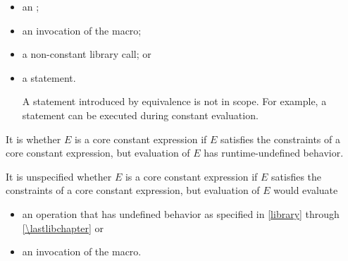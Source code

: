 \begin{itemize}
\item
an ;

\item
an invocation of the  macro;

\item
a non-constant library call;
or

\item
a  statement.
\begin{note}
A  statement introduced by equivalence
is not in scope.
For example, a  statement
can be executed during constant evaluation.
\end{note}
\end{itemize}

\pnum
It is
whether $E$ is a core constant expression
if $E$ satisfies the constraints of a core constant expression, but
evaluation of $E$ has runtime-undefined behavior.

\pnum
It is unspecified whether $E$ is a core constant expression
if $E$ satisfies the constraints of a core constant expression, but
evaluation of $E$ would evaluate
\begin{itemize}
\item
an operation that has undefined behavior
as specified in \ref{library} through \ref{\lastlibchapter} or
\item
an invocation of the  macro.
\end{itemize}


